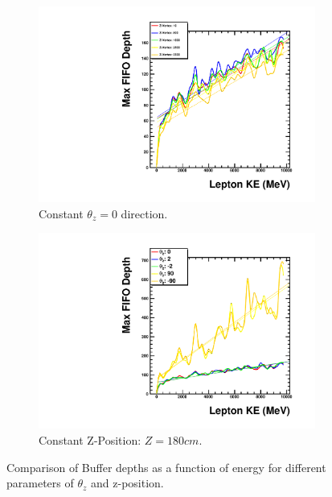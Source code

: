 \begin{figure}
\centering
\begin{subfigure}{.5\textwidth}
  \centering
  \includegraphics[width=\textwidth]{images/Const_Theta0_ASIC_lepKE_multigraph_pdg12_fhc.pdf}
  \caption{Constant $\theta_{z} = 0$ direction.}
\end{subfigure}%
\begin{subfigure}{.5\textwidth}
  \centering
  \includegraphics[width=\textwidth]{images/Const_Z180_ASIC_lepKE_multigraph_pdg12_fhc.pdf}
  \caption{Constant Z-Position: $Z = 180\unit{cm}$.}
\end{subfigure}
\caption{Comparison of Buffer depths as a function of energy for different parameters of $\theta_{z}$ and z-position.}
\label{fig:example_asic_energy_comparison}
\end{figure}

